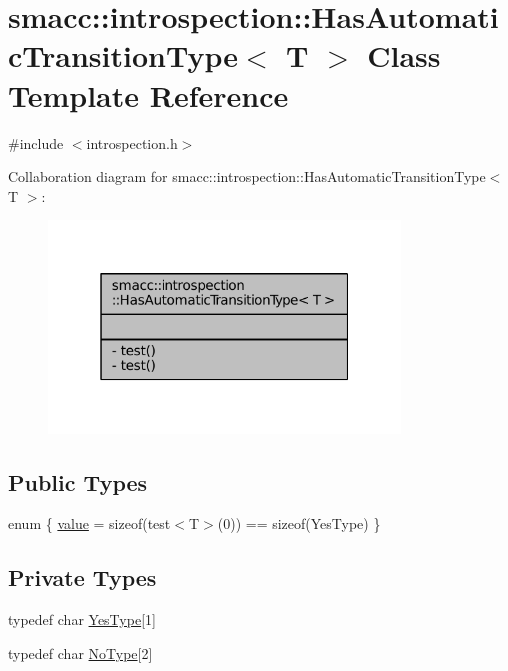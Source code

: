 \hypertarget{classsmacc_1_1introspection_1_1HasAutomaticTransitionType}{}\section{smacc\+:\+:introspection\+:\+:Has\+Automatic\+Transition\+Type$<$ T $>$ Class Template Reference}
\label{classsmacc_1_1introspection_1_1HasAutomaticTransitionType}


{\ttfamily \#include $<$introspection.\+h$>$}



Collaboration diagram for smacc\+:\+:introspection\+:\+:Has\+Automatic\+Transition\+Type$<$ T $>$\+:
\nopagebreak
\begin{figure}[H]
\begin{center}
\leavevmode
\includegraphics[width=265pt]{classsmacc_1_1introspection_1_1HasAutomaticTransitionType__coll__graph}
\end{center}
\end{figure}
\subsection*{Public Types}
\begin{DoxyCompactItemize}
\item 
enum \{ \hyperlink{classsmacc_1_1introspection_1_1HasAutomaticTransitionType_ac663d77745eac0f2b2ceb29e4c8b300ba8aba42189dc17891761a49375684776d}{value} = sizeof(test$<$T$>$(0)) == sizeof(Yes\+Type)
 \}
\end{DoxyCompactItemize}
\subsection*{Private Types}
\begin{DoxyCompactItemize}
\item 
typedef char \hyperlink{classsmacc_1_1introspection_1_1HasAutomaticTransitionType_abeb599df547eb3db36684b6cb343eade}{Yes\+Type}\mbox{[}1\mbox{]}
\item 
typedef char \hyperlink{classsmacc_1_1introspection_1_1HasAutomaticTransitionType_aa2e976214fc770f53aaae67fc049caab}{No\+Type}\mbox{[}2\mbox{]}
\end{DoxyCompactItemize}
